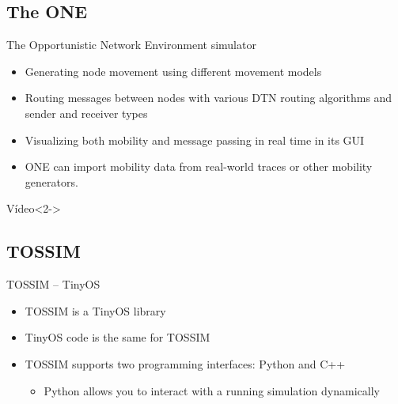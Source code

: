 \documentclass{beamer}
\begin{document}
\subsection{The ONE}

\begin{frame}

\begin{block}{The Opportunistic Network Environment simulator}

	\begin{itemize}
		\item Generating node movement using different movement models
		\item Routing messages between nodes with various DTN routing algorithms and sender and receiver types
		\item Visualizing both mobility and message passing in real time in its GUI
		\item ONE can import mobility data from real-world traces or other mobility generators.
	\end{itemize}

\end{block}

\begin{exampleblock}{Vídeo}<2->
	\centering
\end{exampleblock}


\end{frame}


\subsection{TOSSIM}

\begin{frame}

\begin{block}{TOSSIM -- TinyOS}

	\begin{itemize}
		\item TOSSIM is a TinyOS library
		\item TinyOS code is the same for TOSSIM
		\item TOSSIM supports two programming interfaces: Python and C++
			\begin{itemize}
				\item Python allows you to interact with a running simulation dynamically
			\end{itemize}
	\end{itemize}

\end{block}
\end{frame}
\end{document}

